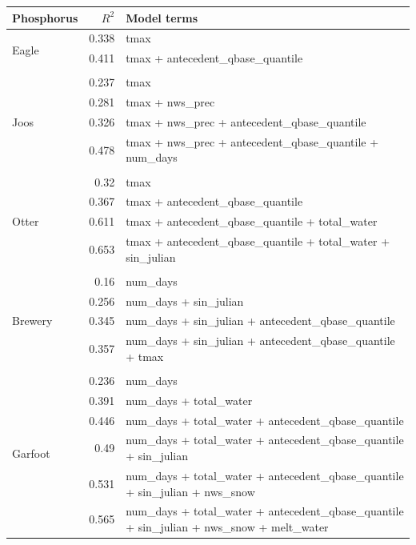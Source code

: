 \documentclass[10pt]{article}
\begin{document}
\begin{table}[h] \small
    \begin{center}
    \begin{tabular}{lrl}
    \textbf{Phosphorus} & $R^2$ & Model terms \\
    \hline
\multirow{3}{*}{Eagle} & 0.338 & tmax\\ 
 & 0.411 & tmax + antecedent\_qbase\_quantile\\ 
\vspace{2mm}\\ \multirow{5}{*}{Joos} & 0.237 & tmax\\ 
 & 0.281 & tmax + nws\_prec\\ 
 & 0.326 & tmax + nws\_prec + antecedent\_qbase\_quantile\\ 
 & 0.478 & tmax + nws\_prec + antecedent\_qbase\_quantile + num\_days\\ 
\vspace{2mm}\\ \multirow{5}{*}{Otter} & 0.32 & tmax\\ 
 & 0.367 & tmax + antecedent\_qbase\_quantile\\ 
 & 0.611 & tmax + antecedent\_qbase\_quantile + total\_water\\ 
 & 0.653 & tmax + antecedent\_qbase\_quantile + total\_water + sin\_julian\\ 
\vspace{2mm}\\ \multirow{5}{*}{Brewery} & 0.16 & num\_days\\ 
 & 0.256 & num\_days + sin\_julian\\ 
 & 0.345 & num\_days + sin\_julian + antecedent\_qbase\_quantile\\ 
 & 0.357 & num\_days + sin\_julian + antecedent\_qbase\_quantile + tmax\\ 
\vspace{2mm}\\ \multirow{7}{*}{Garfoot} & 0.236 & num\_days\\ 
 & 0.391 & num\_days + total\_water\\ 
 & 0.446 & num\_days + total\_water + antecedent\_qbase\_quantile\\ 
 & 0.49 & num\_days + total\_water + antecedent\_qbase\_quantile + sin\_julian\\ 
 & 0.531 & num\_days + total\_water + antecedent\_qbase\_quantile + sin\_julian + nws\_snow\\ 
 & 0.565 & num\_days + total\_water + antecedent\_qbase\_quantile + sin\_julian + nws\_snow + melt\_water\\ 

\end{tabular}
\end{center}
\end{table}
\end{document}
